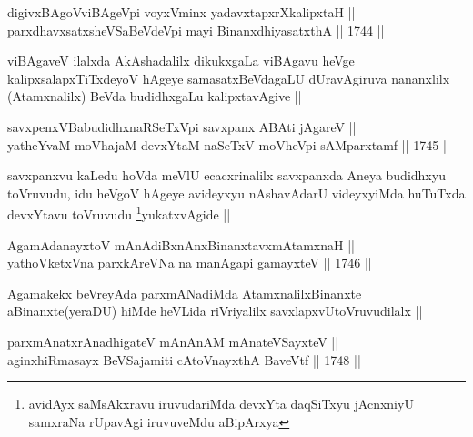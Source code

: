 
\begin{shl}
digivxBAgoV\s viBAgeV\s pi voyxVminx yadavxtapxrXkalipxtaH || \\
parxdhavxsatxsheVSaBeVdeV\s pi mayi BinanxdhiyasatxthA ||  1744 ||  
\end{shl}

\begin{artha}
viBAgaveV ilalxda AkAshadalilx dikukxgaLa viBAgavu heVge
kalipxsalapxTiTxdeyoV hAgeye samasatxBeVdagaLU dUravAgiruva nananxlilx
(Atamxnalilx) BeVda budidhxgaLu kalipxtavAgive ||
\end{artha}


\begin{shl}
savxpenxVBabudidhxnaRSeTxV\s pi savxpanx ABAti jAgareV || \\
yatheYvaM moVhajaM devxYtaM naSeTxV moVheV\s pi sAMparxtamf ||  1745 ||  
\end{shl}

\begin{artha}
savxpanxvu kaLedu hoVda meVlU ecacxrinalilx savxpanxda Aneya budidhxyu
toVruvudu, idu heVgoV hAgeye avideyxyu nAshavAdarU videyxyiMda
huTuTxda devxYtavu toVruvudu \footnote[1]{avidAyx saMsAkxravu
  iruvudariMda devxYta daqSiTxyu jAcnxniyU samxraNa rUpavAgi
  iruvuveMdu aBipArxya}yukatxvAgide ||
\end{artha}


\begin{shl}
AgamAdanayxtoV mAnAdiBxnAnxBinanxtavxmAtamxnaH || \\
yathoVketxVna parxkAreVNa na manAgapi gamayxteV ||  1746 ||  
\end{shl}

\begin{artha}
Agamakekx beVreyAda parxmANadiMda AtamxnalilxBinanxte
aBinanxte(yeraDU) hiMde heVLida riVriyalilx savxlapxvUtoVruvudilalx ||
\end{artha}


\begin{shl}
parxmAnatxrAnadhigateV mAnAnAM mAnateVSayxteV ||  \\
aginxhiRmasayx BeVSajamiti cAtoV\s nayxthA BaveVtf ||  1748 ||  
\end{shl}

